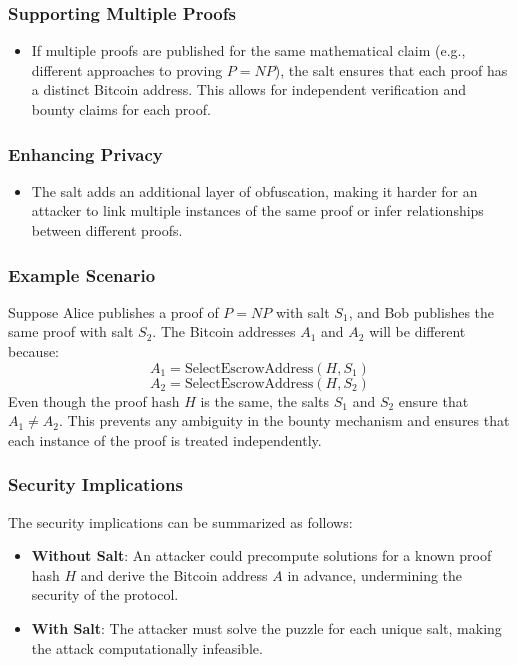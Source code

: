 \documentclass[12pt]{report}
\begin{document}
\subsubsection{Supporting Multiple Proofs}
\begin{itemize}
    \item If multiple proofs are published for the same mathematical claim (e.g., different approaches to proving \( P = NP \)), the salt ensures that each proof has a distinct Bitcoin address. This allows for independent verification and bounty claims for each proof.
\end{itemize}

\subsubsection{Enhancing Privacy}
\begin{itemize}
    \item The salt adds an additional layer of obfuscation, making it harder for an attacker to link multiple instances of the same proof or infer relationships between different proofs.
\end{itemize}

\subsubsection{Example Scenario}
Suppose Alice publishes a proof of \( P = NP \) with salt \( S_1 \), and Bob publishes the same proof with salt \( S_2 \). The Bitcoin addresses \( A_1 \) and \( A_2 \) will be different because:
\[
A_1 = \text{SelectEscrowAddress}(H, S_1)
\]
\[
A_2 = \text{SelectEscrowAddress}(H, S_2)
\]
Even though the proof hash \( H \) is the same, the salts \( S_1 \) and \( S_2 \) ensure that \( A_1 \neq A_2 \). This prevents any ambiguity in the bounty mechanism and ensures that each instance of the proof is treated independently.

\subsubsection{Security Implications}
The security implications can be summarized as follows:
\begin{itemize}
    \item \textbf{Without Salt}: An attacker could precompute solutions for a known proof hash \( H \) and derive the Bitcoin address \( A \) in advance, undermining the security of the protocol.
    \item \textbf{With Salt}: The attacker must solve the puzzle for each unique salt, making the attack computationally infeasible.
\end{itemize}
\end{document}
